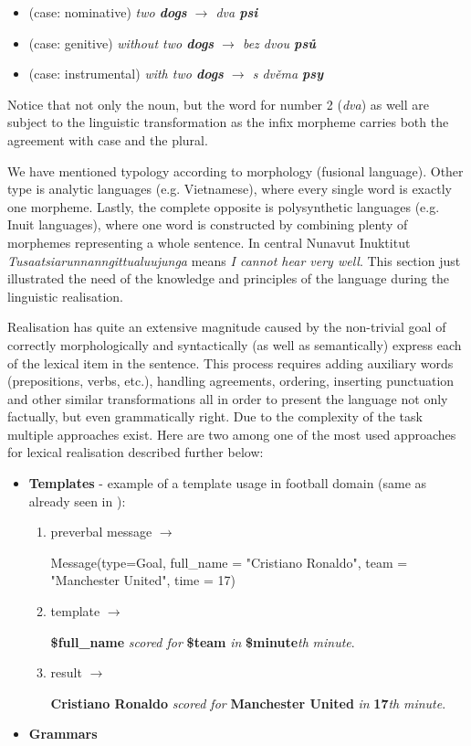 \begin{itemize}
	\item (case: nominative) \emph{two \textbf{dogs}	$\rightarrow$ dva \textbf{psi}}
	\item (case: genitive) 	\emph{without two \textbf{dogs}  $\rightarrow$ bez dvou \textbf{psů}}
	\item (case: instrumental) \emph{with two \textbf{dogs} 	$\rightarrow$ s dvěma \textbf{psy}}
\end{itemize}

Notice that not only the noun, but the word for number 2 (\emph{dva}) as well are subject to the linguistic transformation as the infix morpheme carries both the agreement with case and the plural. 

We have mentioned typology according to morphology (fusional language). Other type is analytic languages (e.g. Vietnamese), where every single word is exactly one morpheme. Lastly, the complete opposite is polysynthetic languages (e.g. Inuit languages), where one word is constructed by combining plenty of morphemes representing a whole sentence. In central Nunavut Inuktitut \emph{Tusaatsiarunnanngittualuujunga} means \emph{I cannot hear very well}. This section just illustrated the need of the knowledge and principles of the language during the linguistic realisation.  

Realisation has quite an extensive magnitude caused by the non-trivial goal of correctly morphologically and syntactically (as well as semantically) express each of the lexical item in the sentence. This process requires adding auxiliary words (prepositions, verbs, etc.), handling agreements, ordering,  inserting punctuation and other similar transformations all in order to present the language not only factually, but even grammatically right. Due to the complexity of the task multiple approaches exist. Here are two among one of the most used approaches for lexical realisation described further below:
\begin{itemize}
	\item \textbf{Templates} - example of a template usage in football domain (same as already seen in ):
	\begin{enumerate}
		\item preverbal message $\rightarrow$ 
		
		Message(type=Goal, full\_name = "Cristiano Ronaldo", team = "Manchester United", time = 17) \label{lr-t-1}
		\item template $\rightarrow$ 
		
		\textbf{\$full\_name} \emph{scored for} \textbf{\$team} \emph{in} \textbf{\$minute}\emph{th} \emph{minute}. \label{lr-t-2}
		\item result $\rightarrow$
		
		\textbf{Cristiano Ronaldo} \emph{scored for} \textbf{Manchester United} \emph{in} \textbf{17}\emph{th} \emph{minute}. \label{lr-t-3}
	\end{enumerate}
	\item \textbf{Grammars}
\end{itemize}

